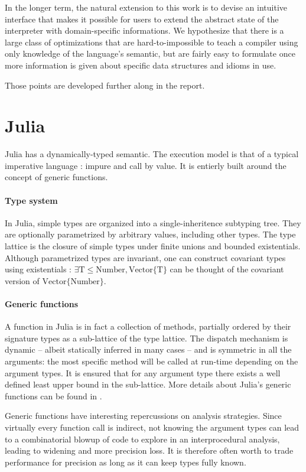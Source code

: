 \documentclass[11pt]{article}
\begin{document}
In the longer term, the natural extension to this work is to devise an intuitive interface that makes it possible for users to extend the abstract state of the interpreter with domain-specific informations. We hypothesize that there is a large class of optimizations that are hard-to-impossible to teach a compiler using only knowledge of the language's semantic, but are fairly easy to formulate once more information is given about specific data structures and idioms in use.

Those points are developed further along in the report.
\clearpage
\section*{Julia}
Julia has a dynamically-typed semantic. The execution model is that of a typical imperative language : impure and call by value. It is entierly built around the concept of generic functions.

\paragraph{Type system} In Julia, simple types are organized into a single-inheritence subtyping tree.
They are optionally parametrized by arbitrary values, including other types.
The type lattice is the closure of simple types under finite unions and bounded existentials.
Although parametrized types are invariant, one can construct covariant types using existentials : $\exists \text{T}\leq\text{Number}, \text{Vector}\{\text{T}\}$ can be thought of the covariant version of $\text{Vector}\{\text{Number}\}$.

\paragraph{Generic functions} A function in Julia is in fact a collection of methods, partially ordered by their signature types as a sub-lattice of the type lattice\cite{julia-paper}.
The dispatch mechanism is dynamic -- albeit statically inferred in many cases -- and is symmetric in all the arguments: the most specific method will be called at run-time depending on the argument types.
It is ensured that for any argument type there exists a well defined least upper bound in the sub-lattice.
More details about Julia's generic functions can be found in \cite{julia-paper,jeff-phd}.

Generic functions have interesting repercussions on analysis strategies. Since virtually every function call is indirect, not knowing the argument types can lead to a combinatorial blowup of code to explore in an interprocedural analysis, leading to widening and more precision loss. It is therefore often worth to trade performance for precision as long as it can keep types fully known\cite{jeff-phd}.
\end{document}
